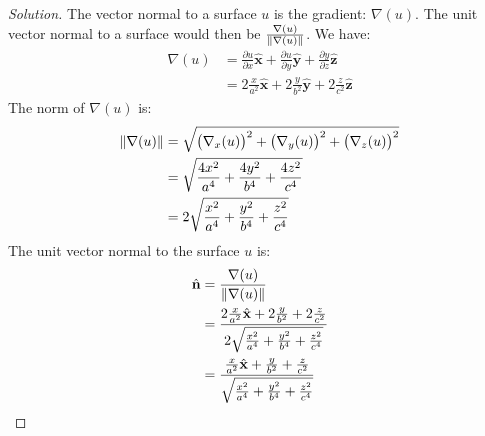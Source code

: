 \documentclass{article}
\theoremstyle{mystyle}
\begin{document}
\begin{proof}[Solution]
The vector normal to a surface $u$ is the gradient: $\nabla(u)$. The unit vector normal to a surface would then be $\frac{\nabla(u)}{\norm{\nabla(u)}}$. We have:
\begin{align*}
    \nabla(u) &=\frac{\partial u}{\partial x}\hat{\mathbf{x}}+\frac{\partial u}{\partial y}\hat{\mathbf{y}}+\frac{\partial y}{\partial z}\hat{\mathbf{z}}\\
    &= 2\frac{x}{a^2}\hat{\mathbf{x}}+2\frac{y}{b^2}\hat{\mathbf{y}}+2\frac{z}{c^2}\hat{\mathbf{z}}
\end{align*}
The norm of $\nabla(u)$ is:
\begin{align*}
    \norm{\nabla(u)}&=\sqrt{\big(\nabla_{x}(u)\big)^{2}+\big(\nabla_{y}(u)\big)^{2}+\big(\nabla_{z}(u)\big)^{2}}\\
    &=\sqrt{\frac{4x^2}{a^4}+\frac{4y^2}{b^4}+\frac{4z^2}{c^4}}\\
    &=2\sqrt{\frac{x^2}{a^4}+\frac{y^2}{b^4}+\frac{z^2}{c^4}}
\end{align*}
The unit vector normal to the surface $u$ is:
\begin{align*}
    \hat{\mathbf{n}}&=\frac{\nabla(u)}{\norm{\nabla(u)}}\\
    &=\frac{2\frac{x}{a^2}\hat{\mathbf{x}}+2\frac{y}{b^2}+2\frac{z}{c^2}}{2\sqrt{\frac{x^2}{a^4}+\frac{y^2}{b^4}+\frac{z^2}{c^4}}}\\
    &=\frac{\frac{x}{a^2}\hat{\mathbf{x}}+\frac{y}{b^2}+\frac{z}{c^2}}{\sqrt{\frac{x^2}{a^4}+\frac{y^2}{b^4}+\frac{z^2}{c^4}}}\\
\end{align*}
\end{proof}
\end{document}
